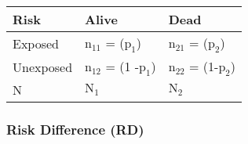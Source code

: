 \documentclass[
]{article}
\begin{document}
\begin{longtable}[]{@{}lll@{}}
\toprule
\begin{minipage}[b]{0.24\columnwidth}\raggedright
Risk\strut
\end{minipage} & \begin{minipage}[b]{0.33\columnwidth}\raggedright
Alive\strut
\end{minipage} & \begin{minipage}[b]{0.33\columnwidth}\raggedright
Dead\strut
\end{minipage}\tabularnewline
\midrule
\endhead
\begin{minipage}[t]{0.24\columnwidth}\raggedright
Exposed\strut
\end{minipage} & \begin{minipage}[t]{0.33\columnwidth}\raggedright
\(\text{n}_{11}\) = (\(\text{p}_{1}\))\strut
\end{minipage} & \begin{minipage}[t]{0.33\columnwidth}\raggedright
\(\text{n}_{21}\) = (\(\text{p}_{2}\))\strut
\end{minipage}\tabularnewline
\begin{minipage}[t]{0.24\columnwidth}\raggedright
Unexposed\strut
\end{minipage} & \begin{minipage}[t]{0.33\columnwidth}\raggedright
\(\text{n}_{12}\) = (1 -\(\text{p}_{1}\))\strut
\end{minipage} & \begin{minipage}[t]{0.33\columnwidth}\raggedright
\(\text{n}_{22}\) = (1-\(\text{p}_{2}\))\strut
\end{minipage}\tabularnewline
\begin{minipage}[t]{0.24\columnwidth}\raggedright
N\strut
\end{minipage} & \begin{minipage}[t]{0.33\columnwidth}\raggedright
\(\text{N}_{1}\)\strut
\end{minipage} & \begin{minipage}[t]{0.33\columnwidth}\raggedright
\(\text{N}_{2}\)\strut
\end{minipage}\tabularnewline
\bottomrule
\end{longtable}

\hypertarget{risk-difference-rd}{%
\subsubsection{Risk Difference (RD)}\label{risk-difference-rd}}
\end{document}

